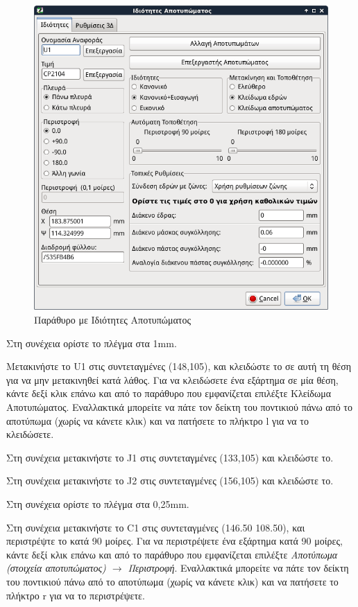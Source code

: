 \documentclass[a4paper]{article}
\begin{document}
\begin{figure}
  \begin{center}
    \includegraphics[width=.9\textwidth]{img/pcb-dial-footprop.png}
    \caption{Παράθυρο με Ιδιότητες Αποτυπώματος}
    \label{fig:pcb-dial-footprop}
  \end{center}
\end{figure}


Στη συνέχεια ορίστε το πλέγμα στα 1mm.

Μετακινήστε το U1 στις συντεταγμένες (148,105), και κλειδώστε το σε αυτή τη θέση για να μην μετακινηθεί κατά λάθος. Για να κλειδώσετε ένα εξάρτημα σε μία θέση, κάντε δεξί κλικ επάνω και από το παράθυρο που εμφανίζεται επιλέξτε Κλείδωμα Αποτυπώματος. Εναλλακτικά μπορείτε να πάτε τον δείκτη του ποντικιού πάνω από το αποτύπωμα (χωρίς να κάνετε κλικ) και να πατήσετε το πλήκτρο l για να το κλειδώσετε.

Στη συνέχεια μετακινήστε το J1 στις συντεταγμένες (133,105) και κλειδώστε το.

Στη συνέχεια μετακινήστε το J2 στις συντεταγμένες (156,105) και κλειδώστε το.

Στη συνέχεια ορίστε το πλέγμα στα 0,25mm.

Στη συνέχεια μετακινήστε το C1 στις συντεταγμένες (146.50 108.50), και περιστρέψτε το κατά 90 μοίρες.  Για να περιστρέψετε ένα εξάρτημα κατά 90 μοίρες, κάντε δεξί κλικ επάνω και από το παράθυρο που εμφανίζεται επιλέξτε \textit{Αποτύπωμα (στοιχεία αποτυπώματος) $\rightarrow$ Περιστροφή}. Εναλλακτικά μπορείτε να πάτε τον δείκτη του ποντικιού πάνω από το αποτύπωμα (χωρίς να κάνετε κλικ) και να πατήσετε το πλήκτρο r για να το περιστρέψετε.
\end{document}
